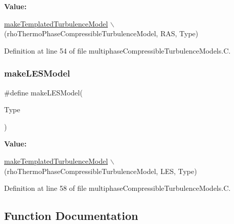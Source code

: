 {\bfseries Value\+:}
\begin{DoxyCode}
\hyperlink{multiphaseCompressibleTurbulenceModels_8C_a31356fdc4a477f59da9ad0a6e70e481e}{makeTemplatedTurbulenceModel}                                               \(\backslash\)
    (rhoThermoPhaseCompressibleTurbulenceModel, RAS, Type)
\end{DoxyCode}


Definition at line 54 of file multiphase\+Compressible\+Turbulence\+Models.\+C.

\mbox{\label{multiphaseCompressibleTurbulenceModels_8C_af0d95159f8968bae1e71a9f29ab8359f}} 
\subsubsection{\texorpdfstring{make\+L\+E\+S\+Model}{makeLESModel}}
{\footnotesize\ttfamily \#define make\+L\+E\+S\+Model(\begin{DoxyParamCaption}\item[{}]{Type }\end{DoxyParamCaption})}

{\bfseries Value\+:}
\begin{DoxyCode}
\hyperlink{multiphaseCompressibleTurbulenceModels_8C_a31356fdc4a477f59da9ad0a6e70e481e}{makeTemplatedTurbulenceModel}                                               \(\backslash\)
    (rhoThermoPhaseCompressibleTurbulenceModel, LES, Type)
\end{DoxyCode}


Definition at line 58 of file multiphase\+Compressible\+Turbulence\+Models.\+C.



\subsection{Function Documentation}
\mbox{\label{multiphaseCompressibleTurbulenceModels_8C_af870ea713204ad3d78e94706815d4c44}} 
